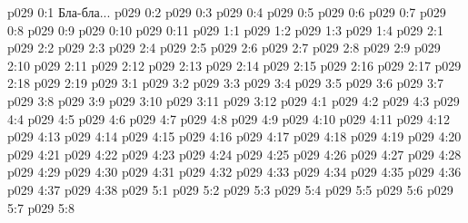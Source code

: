 \author{Всеобщий Цензор}
\vs p029 0:1  Бла-бла...
\vs p029 0:2 
\vs p029 0:3 
\vs p029 0:4 
\vs p029 0:5 \pc 
\vs p029 0:6 
\vs p029 0:7 
\vs p029 0:8 
\vs p029 0:9 
\vs p029 0:10 \pc 
\vs p029 0:11 
\vs p029 1:1 
\vs p029 1:2 
\vs p029 1:3 
\vs p029 1:4 
\vs p029 2:1 
\vs p029 2:2 
\vs p029 2:3 
\vs p029 2:4 
\vs p029 2:5 
\vs p029 2:6 
\vs p029 2:7 
\vs p029 2:8 
\vs p029 2:9 \pc 
\vs p029 2:10 
\vs p029 2:11 
\vs p029 2:12 
\vs p029 2:13 
\vs p029 2:14 
\vs p029 2:15 
\vs p029 2:16 
\vs p029 2:17 
\vs p029 2:18 
\vs p029 2:19 
\vs p029 3:1 
\vs p029 3:2 
\vs p029 3:3 
\vs p029 3:4 \pc 
\vs p029 3:5 
\vs p029 3:6 \pc 
\vs p029 3:7 
\vs p029 3:8 
\vs p029 3:9 \pc 
\vs p029 3:10 \pc 
\vs p029 3:11 
\vs p029 3:12 
\vs p029 4:1 
\vs p029 4:2 
\vs p029 4:3 
\vs p029 4:4 \pc 
\vs p029 4:5 
\vs p029 4:6 
\vs p029 4:7 
\vs p029 4:8 
\vs p029 4:9 
\vs p029 4:10 
\vs p029 4:11 
\vs p029 4:12 \pc 
\vs p029 4:13 
\vs p029 4:14 
\vs p029 4:15 
\vs p029 4:16 
\vs p029 4:17 
\vs p029 4:18 
\vs p029 4:19 
\vs p029 4:20 
\vs p029 4:21 
\vs p029 4:22 
\vs p029 4:23 
\vs p029 4:24 
\vs p029 4:25 
\vs p029 4:26 \pc 
\vs p029 4:27 
\vs p029 4:28 
\vs p029 4:29 
\vs p029 4:30 
\vs p029 4:31 
\vs p029 4:32 
\vs p029 4:33 
\vs p029 4:34 
\vs p029 4:35 
\vs p029 4:36 
\vs p029 4:37 
\vs p029 4:38 
\vs p029 5:1 
\vs p029 5:2 
\vs p029 5:3 
\vs p029 5:4 \pc 
\vs p029 5:5 \pc 
\vs p029 5:6 
\vs p029 5:7 
\vsetoff
\vs p029 5:8 
\quizlink
